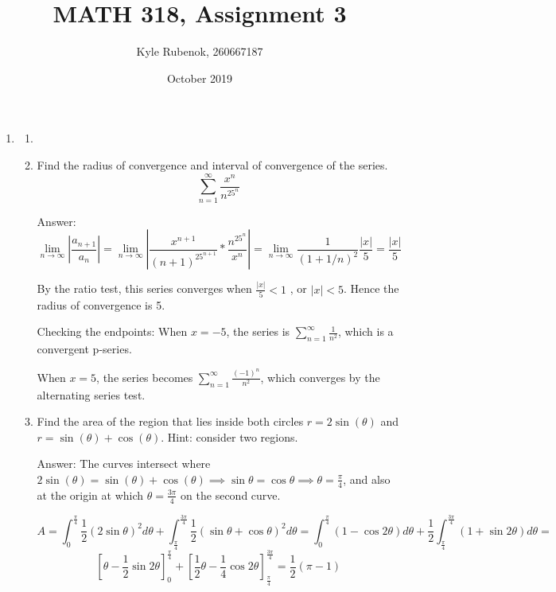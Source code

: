 \documentclass{article}
\title{MATH 318, Assignment 3}
\author{Kyle Rubenok, 260667187}
\date{October 2019}
\begin{document}
\maketitle

\begin{enumerate}
    \item 
    \begin{enumerate}
        \item
        
    
\item
Find the radius of convergence and interval of convergence of the series.
    \begin{equation}
        \sum_{n=1}^{\infty} \frac{x^n}{n^25^n}
        \end{equation}
        
        Answer:
        $$ \lim_{n\to\infty} \left|\frac{a_{n+1}}{a_{n}}\right| = \lim_{n\to\infty}\left|\frac{x^{n+1}}{(n+1)^25^{n+1}}*\frac{n^25^n}{x^n}\right| = \lim_{n\to\infty} \frac{1}{(1+1/n)^2}\frac{|x|}{5} = \frac{|x|}{5}  $$
        
        By the ratio test, this series converges when $ \frac{|x|}{5}<1 $ , or $|x|<5$. Hence the radius of convergence is 5. 
        
        Checking the endpoints: When $x=-5$, the series is $\sum_{n=1}^{\infty} \frac{1}{n^2}$, which is a convergent p-series. 
        
        When $x=5$, the series becomes $\sum_{n=1}^{\infty} \frac{(-1)^n}{n^2}$, which converges by the alternating series test.
        



\item
Find the area of the region that lies inside both circles $r=2\sin(\theta)$ and $r=\sin(\theta)+\cos(\theta)$. Hint: consider two regions.

Answer:
The curves intersect where $2\sin(\theta)=\sin(\theta)+\cos(\theta)\implies \sin\theta=\cos\theta\implies\theta=\frac{\pi}{4}$, and also at the origin at which $\theta=\frac{3\pi}{4}$ on the second curve.

$$A=\int_{0}^{\frac{\pi}{4}}\frac{1}{2}(2\sin\theta)^2 d\theta+\int_{\frac{\pi}{4}}^{\frac{3\pi}{4}}\frac{1}{2}(\sin\theta+\cos\theta)^2 d\theta = \int_{0}^{\frac{\pi}{4}}(1-\cos2\theta) d\theta+\frac{1}{2}\int_{\frac{\pi}{4}}^{\frac{3\pi}{4}}(1+\sin2\theta) d\theta = $$ 
$$ [\theta-\frac{1}{2}\sin2\theta]^{\frac{\pi}{4}}_0+[\frac{1}{2}\theta-\frac{1}{4}\cos2\theta]^{\frac{3\pi}{4}}_{\frac{\pi}{4}} = \frac{1}{2}(\pi-1)$$


\end{enumerate}
\end{enumerate}
\end{document}
